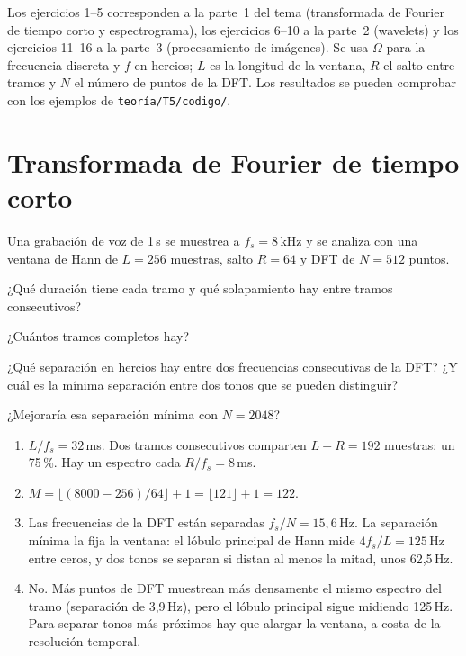 \documentclass[11pt,a4paper]{scrartcl}
\begin{document}
\ifsoluciones{}\else{}\fi

Los ejercicios 1–5 corresponden a la parte~1 del tema (transformada de Fourier de tiempo corto y espectrograma), los ejercicios 6–10 a la parte~2 (wavelets) y los ejercicios 11–16 a la parte~3 (procesamiento de imágenes). Se usa $\Omega$ para la frecuencia discreta y $f$ en hercios; $L$ es la longitud de la ventana, $R$ el salto entre tramos y $N$ el número de puntos de la DFT. Los resultados se pueden comprobar con los ejemplos de \texttt{teoría/T5/codigo/}.

\section*{Transformada de Fourier de tiempo corto}

\begin{ejercicio}
  Una grabación de voz de 1\,s se muestrea a $f_s=8$\,kHz y se analiza con una ventana de Hann de $L=256$ muestras, salto $R=64$ y DFT de $N=512$ puntos.
  \begin{incisos}[1]
    \item ¿Qué duración tiene cada tramo y qué solapamiento hay entre tramos consecutivos?
    \item ¿Cuántos tramos completos hay?
    \item ¿Qué separación en hercios hay entre dos frecuencias consecutivas de la DFT? ¿Y cuál es la mínima separación entre dos tonos que se pueden distinguir?
    \item ¿Mejoraría esa separación mínima con $N=2048$?
  \end{incisos}
\end{ejercicio}
\begin{solucion}
  \begin{enumerate}[label=\alph*)]
    \item $L/f_s=32$\,ms. Dos tramos consecutivos comparten $L-R=192$ muestras: un 75\,\%. Hay un espectro cada $R/f_s=8$\,ms.
    \item $M=\lfloor(8000-256)/64\rfloor+1=\lfloor121\rfloor+1=122$.
    \item Las frecuencias de la DFT están separadas $f_s/N=15{,}6$\,Hz. La separación mínima la fija la ventana: el lóbulo principal de Hann mide $4f_s/L=125$\,Hz entre ceros, y dos tonos se separan si distan al menos la mitad, unos 62,5\,Hz.
    \item No. Más puntos de DFT muestrean más densamente el mismo espectro del tramo (separación de 3,9\,Hz), pero el lóbulo principal sigue midiendo 125\,Hz. Para separar tonos más próximos hay que alargar la ventana, a costa de la resolución temporal.
  \end{enumerate}
\end{solucion}
\end{document}
